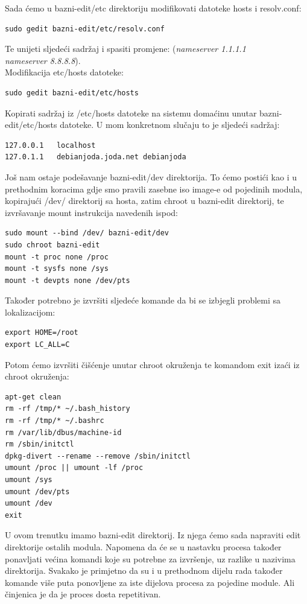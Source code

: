 \documentclass[12pt,vi]{mitthesis}
\begin{document}
Sada ćemo u bazni-edit/etc direktoriju modifikovati datoteke hosts i resolv.conf:
\begin{lstlisting}[style=BashInputStyle]
sudo gedit bazni-edit/etc/resolv.conf
\end{lstlisting}
Te unijeti sljedeći sadržaj i spasiti promjene:
(\textit{nameserver 1.1.1.1 \\
nameserver 8.8.8.8}).\\
\noindent
Modifikacija etc/hosts datoteke:
\begin{lstlisting}[style=BashInputStyle]
sudo gedit bazni-edit/etc/hosts
\end{lstlisting}
Kopirati sadržaj iz /etc/hosts datoteke na sistemu domaćinu unutar bazni-edit/etc/hosts datoteke. U mom konkretnom slučaju to je sljedeći sadržaj:
\begin{lstlisting}
127.0.0.1	localhost
127.0.1.1	debianjoda.joda.net	debianjoda
\end{lstlisting}

\noindent
Još nam ostaje podešavanje bazni-edit/dev direktorija. To ćemo postići kao i u prethodnim koracima gdje smo pravili zasebne iso image-e od pojedinih modula, kopirajući /dev/ direktorij sa hosta, zatim chroot u bazni-edit direktorij, te izvršavanje mount instrukcija navedenih ispod:
\begin{lstlisting}[style=BashInputStyle]
sudo mount --bind /dev/ bazni-edit/dev
sudo chroot bazni-edit
mount -t proc none /proc
mount -t sysfs none /sys
mount -t devpts none /dev/pts
\end{lstlisting}

\noindent
Također potrebno je izvršiti sljedeće komande da bi se izbjegli problemi sa lokalizacijom:
\begin{lstlisting}[style=BashInputStyle]
export HOME=/root
export LC_ALL=C
\end{lstlisting}

Potom ćemo izvršiti čišćenje unutar chroot okruženja te komandom exit izaći iz chroot okruženja:
\begin{lstlisting}[style=BashInputStyle]
apt-get clean
rm -rf /tmp/* ~/.bash_history
rm -rf /tmp/* ~/.bashrc
rm /var/lib/dbus/machine-id
rm /sbin/initctl
dpkg-divert --rename --remove /sbin/initctl
umount /proc || umount -lf /proc
umount /sys
umount /dev/pts
umount /dev
exit
\end{lstlisting}
\indent
U ovom trenutku imamo bazni-edit direktorij. Iz njega ćemo sada napraviti edit direktorije ostalih modula. Napomena da će se u nastavku procesa također ponavljati većina komandi koje su potrebne za izvršenje, uz razlike u nazivima direktorija. Svakako je primjetno da su i u prethodnom dijelu rada također komande više puta ponovljene za iste dijelova procesa za pojedine module. Ali činjenica je da je proces dosta repetitivan.
\end{document}
